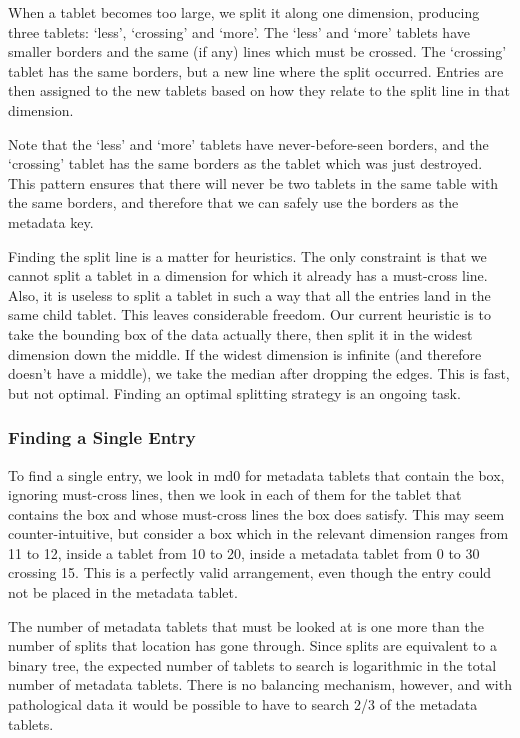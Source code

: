 \documentclass[11pt]{article}
\begin{document}
When a tablet becomes too large, we split it along one dimension, producing three tablets: `less', `crossing' and `more'. The `less' and `more' tablets have smaller borders and the same (if any) lines which must be crossed. The `crossing' tablet has the same borders, but a new line where the split occurred. Entries are then assigned to the new tablets based on how they relate to the split line in that dimension.

Note that the `less' and `more' tablets have never-before-seen borders, and the `crossing' tablet has the same borders as the tablet which was just destroyed. This pattern ensures that there will never be two tablets in the same table with the same borders, and therefore that we can safely use the borders as the metadata key.

Finding the split line is a matter for heuristics. The only constraint is that we cannot split a tablet in a dimension for which it already has a must-cross line. Also, it is useless to split a tablet in such a way that all the entries land in the same child tablet. This leaves considerable freedom. Our current heuristic is to take the bounding box of the data actually there, then split it in the widest dimension down the middle. If the widest dimension is infinite (and therefore doesn't have a middle), we take the median after dropping the edges. This is fast, but not optimal. Finding an optimal splitting strategy is an ongoing task.

\subsubsection{Finding a Single Entry}

To find a single entry, we look in md0 for metadata tablets that contain the box, ignoring must-cross lines, then we look in each of them for the tablet that contains the box and whose must-cross lines the box does satisfy. This may seem counter-intuitive, but consider a box which in the relevant dimension ranges from 11 to 12, inside a tablet from 10 to 20, inside a metadata tablet from 0 to 30 crossing 15. This is a perfectly valid arrangement, even though the entry could not be placed in the metadata tablet.

The number of metadata tablets that must be looked at is one more than the number of splits that location has gone through. Since splits are equivalent to a binary tree, the expected number of tablets to search is logarithmic in the total number of metadata tablets. There is no balancing mechanism, however, and with pathological data it would be possible to have to search 2/3 of the metadata tablets.
\end{document}
